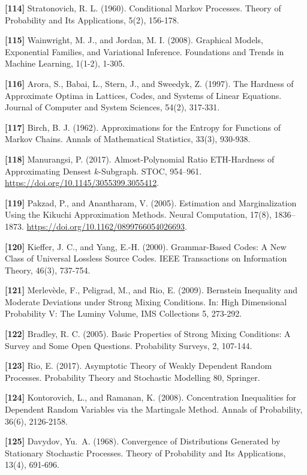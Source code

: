 \documentclass[
]{article}
\begin{document}
\textbf{{[}114{]}} Stratonovich, R. L. (1960). Conditional Markov
Processes. Theory of Probability and Its Applications, 5(2), 156-178.

\textbf{{[}115{]}} Wainwright, M. J., and Jordan, M. I. (2008).
Graphical Models, Exponential Families, and Variational Inference.
Foundations and Trends in Machine Learning, 1(1-2), 1-305.

\textbf{{[}116{]}} Arora, S., Babai, L., Stern, J., and Sweedyk, Z.
(1997). The Hardness of Approximate Optima in Lattices, Codes, and
Systems of Linear Equations. Journal of Computer and System Sciences,
54(2), 317-331.

\textbf{{[}117{]}} Birch, B. J. (1962). Approximations for the Entropy
for Functions of Markov Chains. Annals of Mathematical Statistics,
33(3), 930-938.

\textbf{{[}118{]}} Manurangsi, P.
(2017). Almost-Polynomial Ratio ETH-Hardness of Approximating Densest
$k$-Subgraph. STOC, 954--961. \url{https://doi.org/10.1145/3055399.3055412}.

\textbf{{[}119{]}} Pakzad, P., and Anantharam, V. (2005).
Estimation and Marginalization Using the Kikuchi Approximation Methods.
Neural Computation, 17(8), 1836--1873.
\url{https://doi.org/10.1162/0899766054026693}.

\textbf{{[}120{]}} Kieffer, J. C., and Yang, E.-H. (2000). Grammar-Based
Codes: A New Class of Universal Lossless Source Codes. IEEE Transactions
on Information Theory, 46(3), 737-754.

\textbf{{[}121{]}} Merlev\`ede, F., Peligrad, M., and Rio, E. (2009).
Bernstein Inequality and Moderate Deviations under Strong Mixing
Conditions. In: High Dimensional Probability V: The Luminy Volume,
IMS Collections 5, 273-292.

\textbf{{[}122{]}} Bradley, R. C. (2005). Basic Properties of Strong
Mixing Conditions: A Survey and Some Open Questions. Probability
Surveys, 2, 107-144.

\textbf{{[}123{]}} Rio, E. (2017). Asymptotic Theory of Weakly
Dependent Random Processes. Probability Theory and Stochastic
Modelling 80, Springer.

\textbf{{[}124{]}} Kontorovich, L., and Ramanan, K. (2008).
Concentration Inequalities for Dependent Random Variables via the
Martingale Method. Annals of Probability, 36(6), 2126-2158.

\textbf{{[}125{]}} Davydov, Yu.\ A. (1968). Convergence of
Distributions Generated by Stationary Stochastic Processes. Theory
of Probability and Its Applications, 13(4), 691-696.
\end{document}

